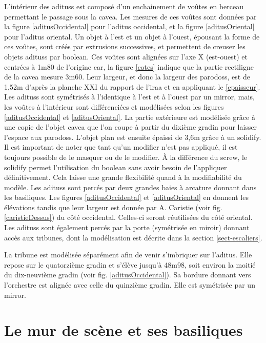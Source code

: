 L'intérieur des \glspl{aditus} est composé d'un enchainement de voûtes en berceau permettant le passage sous la \gls{cavea}. Les mesures de ces voûtes sont données par la figure \ref{aditusOccidental} pour l'\gls{aditus} occidental, et la figure \ref{aditusOriental} pour l'\gls{aditus} oriental. Un objet à l'est et un objet à l'ouest, épousant la forme de ces voûtes, sont créés par extrusions successives, et permettent de creuser les objets \glspl{aditus} par \gls{boolean}. Ces voûtes sont alignées sur l'axe X (est-ouest) et centrées à 1m80 de l'origine car, la figure \ref{cotes} indique que la partie rectiligne de la \gls{cavea} mesure 3m60. Leur largeur, et donc la largeur des \glspl{parodos}, est de 1,52m d'après la planche XXI du rapport de l'\gls{iraa}\cite[Pl. XXI]{orangePl} et en appliquant le \ref{epaisseur}. Les \glspl{aditus} sont symétrisés à l'identique à l'est et à l'ouest par un \gls{mirror}, mais, les voûtes à l'intérieur sont différenciées et modélisées selon les figures \ref{aditusOccidental} et \ref{aditusOriental}. La partie extérieure est modélisée grâce à une copie de l'objet \gls{cavea} que l'on coupe à partir du dixième gradin pour laisser l'espace aux \glspl{parodos}. L'objet plan est ensuite épaissi de 3,6m grâce à un \gls{solidify}. Il est important de noter que tant qu'un \gls{modifier} n'est pas appliqué, il est toujours possible de le masquer ou de le modifier. À la différence du \gls{screw}, le \gls{solidify} permet l'utilisation du \gls{boolean} sans avoir besoin de l'appliquer définitivement. Cela laisse une grande flexibilité quand à la modifiabilité du modèle. Les \glspl{aditus} sont percés par deux grandes baies à arcature donnant dans les basiliques. Les figures \ref{aditusOccidental} et \ref{aditusOriental} en donnent les élévations tandis que leur largeur est donnée par A. Caristie (voir fig. \ref{caristieDessus}) du côté occidental. Celles-ci seront réutilisées du côté oriental. Les \glspl{aditus} sont également percés par la porte (symétrisée en miroir) donnant accès aux tribunes, dont la modélisation est décrite dans la section \ref{sect-escaliers}.

La tribune est modélisée séparément afin de venir s'imbriquer sur l'\gls{aditus}. Elle repose sur le quatorzième gradin et s'élève jusqu'à 48m98, soit environ la moitié du dix-neuvième gradin (voir fig. \ref{aditusOccidental}). Sa bordure donnant vers l'orchestre est alignée avec celle du quinzième gradin. Elle est symétrisée par un \gls{mirror}.

\section{Le mur de scène et ses \glspl{basilique}} 
\label{mur}


